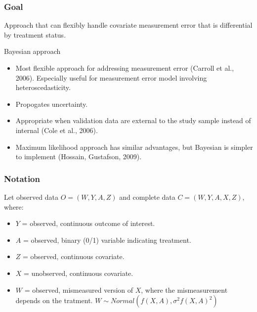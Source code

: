 \documentclass{beamer}
\begin{document}
\begin{frame}

\frametitle{ Goal}


Approach that can flexibly handle covariate measurement error that is differential by treatment status.



Bayesian approach
\begin{itemize}
	\item Most flexible approach for addressing measurement error (Carroll et al., 2006). Especially useful for measurement error model involving heteroscedasticity.
	\item Propogates uncertainty.
	\item Appropriate when validation data are external to the study sample instead of internal (Cole et al., 2006).
	\item Maximum likelihood approach has similar advantages, but Bayesian is simpler to implement (Hossain, Gustafson, 2009).
\end{itemize}

 

\end{frame} 

\begin{frame}

\frametitle{ Notation}


Let observed data $O=(W, Y, A, Z)$ and complete data $C=(W, Y, A, X, Z)$, where:


\begin{itemize}
\item $Y$ = observed, continuous outcome of interest. 

\item $A$ = observed, binary (0/1) variable indicating treatment. 

\item $Z$ = observed, continuous covariate. 

\item $X$ = unobserved, continuous covariate. 

\item $W$ = observed, mismeasured version of $X$, where the mismeasurement depends on the tratment. $W \sim Normal(f(X,A), \sigma^2f(X,A)^2)$

\end{itemize}


\end{frame} 
\end{document}

